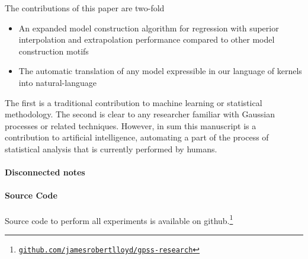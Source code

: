\documentclass{article}
\begin{document}
The contributions of this paper are two-fold
\begin{itemize}
  \item An expanded model construction algorithm for regression with superior interpolation and extrapolation performance compared to other model construction motifs
  \item The automatic translation of any model expressible in our language of kernels into natural-language
\end{itemize}
The first is a traditional contribution to machine learning or statistical methodology.
The second is clear to any researcher familiar with Gaussian processes or related techniques.
However, in sum this manuscript is a contribution to artificial intelligence, automating a part of the process of statistical analysis that is currently performed by humans.

\paragraph{Disconnected notes}





\paragraph{Source Code}
Source code to perform all experiments is available on github.\footnote{
\href{http://www.github.com/jamesrobertlloyd/gpss-research}
{\texttt{github.com/jamesrobertlloyd/gpss-research}}}

\end{document}
